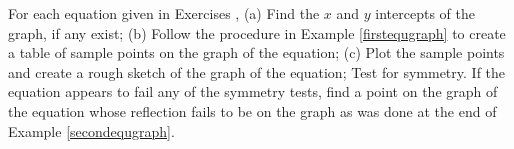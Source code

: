 {\noindent For each equation given in Exercises}
{, (a) Find the $x$ and $y$ intercepts of the graph, if any exist; (b) Follow the procedure in Example \ref{firstequgraph} to create a table of sample points on the graph of the equation; (c) Plot the sample points and create a rough sketch of the graph of the equation; Test for symmetry.  If the equation appears to fail any of the symmetry tests, find a point on the graph of the equation whose reflection fails to be on the graph as was done at the end of Example \ref{secondequgraph}.}
